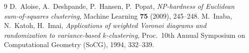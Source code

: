 \documentclass{amsart}
\theoremstyle{plain}
\theoremstyle{definition}
\begin{document}
\begin{thebibliography}{9}
 D.~Aloise, A.~Deshpande, P.~Hansen, P.~Popat,
\emph{NP-hardness of Euclidean sum-of-squares clustering},
Machine Learning \textbf{75} (2009), 245--248.
 M.~Inaba, N.~Katoh, H.~Imai,
\emph{Applications of weighted Voronoi diagrams and randomization to
variance-based $k$-clustering}, Proc.\ 10th Annual Symposium on Computational
Geometry (SoCG), 1994, 332--339.
\end{thebibliography}
\end{document}
